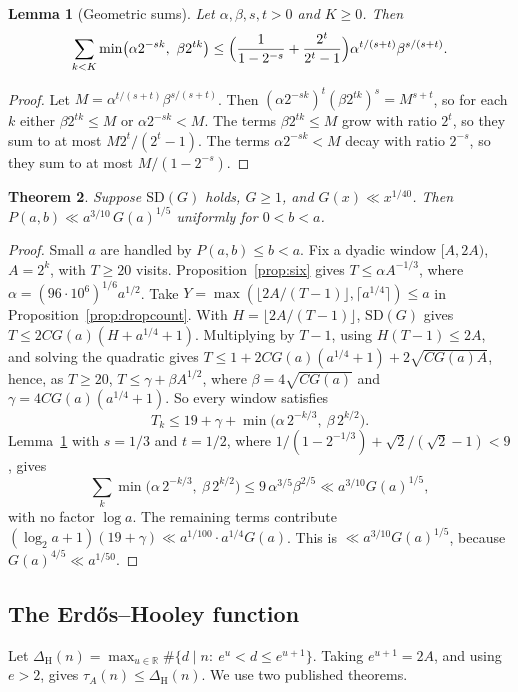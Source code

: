 \documentclass[11pt]{amsart}
\newtheorem{theorem}{Theorem}[section]
\newtheorem{lemma}[theorem]{Lemma}
\theoremstyle{definition}
\theoremstyle{remark}
\begin{document}
\begin{lemma}[Geometric sums]\label{lem:geom}
Let $\alpha,\beta,s,t>0$ and $K\ge0$. Then
\[
\sum_{k<K}\min\bigl(\alpha2^{-sk},\ \beta2^{tk}\bigr)\le
\Bigl(\frac1{1-2^{-s}}+\frac{2^t}{2^t-1}\Bigr)\alpha^{t/(s+t)}\beta^{s/(s+t)} .
\]
\end{lemma}

\begin{proof}
Let $M=\alpha^{t/(s+t)}\beta^{s/(s+t)}$. Then $(\alpha2^{-sk})^t(\beta2^{tk})^s=M^{s+t}$, so for each
$k$ either $\beta2^{tk}\le M$ or $\alpha2^{-sk}<M$. The terms $\beta2^{tk}\le M$ grow with ratio
$2^t$, so they sum to at most $M2^t/(2^t-1)$. The terms $\alpha2^{-sk}<M$ decay with ratio $2^{-s}$,
so they sum to at most $M/(1-2^{-s})$.
\end{proof}

\begin{theorem}\label{thm:generic}
Suppose $\mathrm{SD}(G)$ holds, $G\ge1$, and $G(x)\ll x^{1/40}$. Then
$P(a,b)\ll a^{3/10}\,G(a)^{1/5}$ uniformly for $0<b<a$.
\end{theorem}

\begin{proof}
Small $a$ are handled by $P(a,b)\le b<a$. Fix a dyadic window $[A,2A)$, $A=2^k$, with
$T\ge20$ visits. Proposition~\ref{prop:six} gives $T\le\alpha A^{-1/3}$, where
$\alpha=(96\cdot10^6)^{1/6}a^{1/2}$. Take $Y=\max(\lfloor 2A/(T-1)\rfloor,\lceil a^{1/4}\rceil)\le a$
in Proposition~\ref{prop:dropcount}. With $H=\lfloor 2A/(T-1)\rfloor$, $\mathrm{SD}(G)$ gives
$T\le 2CG(a)(H+a^{1/4}+1)$. Multiplying by $T-1$, using $H(T-1)\le2A$, and solving the quadratic
gives $T\le1+2CG(a)(a^{1/4}+1)+2\sqrt{CG(a)A}$, hence, as $T\ge20$, $T\le\gamma+\beta A^{1/2}$,
where $\beta=4\sqrt{CG(a)}$ and $\gamma=4CG(a)(a^{1/4}+1)$. So
every window satisfies
\[
T_k\le 19+\gamma+\min\bigl(\alpha\,2^{-k/3},\ \beta\,2^{k/2}\bigr).
\]
Lemma~\ref{lem:geom} with $s=1/3$ and $t=1/2$, where $1/(1-2^{-1/3})+\sqrt2/(\sqrt2-1)<9$, gives
\[
\sum_{k}\min\bigl(\alpha\,2^{-k/3},\ \beta\,2^{k/2}\bigr)\le 9\,\alpha^{3/5}\beta^{2/5}\ll a^{3/10}G(a)^{1/5},
\]
with no factor $\log a$. The remaining terms contribute
$(\log_2a+1)(19+\gamma)\ll a^{1/100}\cdot a^{1/4}G(a)$. This is
$\ll a^{3/10}G(a)^{1/5}$, because $G(a)^{4/5}\ll a^{1/50}$.
\end{proof}

\subsection*{The Erd\H{o}s--Hooley function}
Let $\Delta_{\mathrm H}(n)=\max_{u\in\mathbb R}\#\{d\mid n:\ e^u<d\le e^{u+1}\}$. Taking
$e^{u+1}=2A$, and using $e>2$, gives $\tau_A(n)\le\Delta_{\mathrm H}(n)$. We use two published
theorems.
\end{document}
